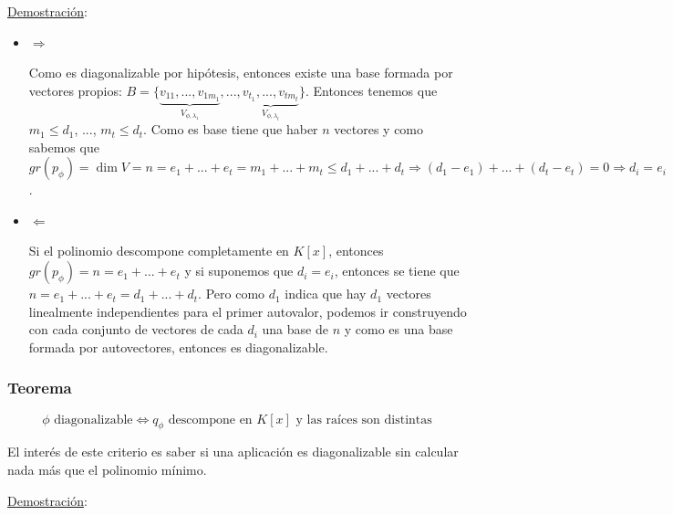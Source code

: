\documentclass[10pt,a4paper,openright]{book}
\begin{document}
\underline{Demostración}:
\begin{itemize}
\item $\Rightarrow$

Como es diagonalizable por hipótesis, entonces existe una base formada por vectores propios: $B=\{\underbrace{v_{11}, ..., v_{1m_1}}_{V_{\phi,\lambda_1}}, ...,\underbrace{v_{t_1}, ..., v_{tm_t}}_{V_{\phi,\lambda_t}}\}$. Entonces tenemos que $m_1\leq d_1$, ..., $m_t\leq d_t$. Como es base tiene que haber $n$ vectores y como sabemos que $gr(p_\phi)=\dim V = n= e_1+...+e_t=m_1+...+m_t\leq d_1+...+d_t\Rightarrow (d_1-e_1)+...+(d_t-e_t)=0\Rightarrow d_i=e_i$.

\item $\Leftarrow$

Si el polinomio descompone completamente en $K[x]$, entonces $gr(p_\phi)=n = e_1+...+e_t$ y si suponemos que $d_i=e_i$, entonces se tiene que $n=e_1+...+e_t=d_1+...+d_t$. Pero como $d_1$ indica que hay $d_1$ vectores linealmente independientes para el primer autovalor, podemos ir construyendo con cada conjunto de vectores de cada $d_i$ una base de $n$ y como es una base formada por autovectores, entonces es diagonalizable.
\end{itemize}

\subsubsection*{Teorema}
$$\phi\mbox{ diagonalizable}\Leftrightarrow q_\phi\mbox{ descompone en } K[x]\mbox{ y las raíces son distintas}$$

El interés de este criterio es saber si una aplicación es diagonalizable sin calcular nada más que el polinomio mínimo.

\underline{Demostración}:
\end{document}
